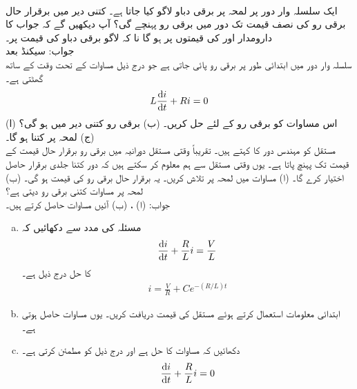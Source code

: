\\
ایک سلسلہ وار  دور پر لمحہ  پر برقی دباو لاگو کیا جاتا ہے۔ کتنی دیر میں برقرار حال برقی رو کی نصف قیمت تک دور میں برقی رو پہنچے گی؟ آپ دیکھیں گے کہ جواب کا دارومدار  اور  کی قیمتوں پر ہو گا نا کہ لاگو برقی دباو کی قیمت پر۔\\
جواب:\quad
{} سیکنڈ بعد
\\
سلسلہ وار  دور میں ابتدائی طور پر  برقی رو پائی جاتی ہے جو درج ذیل مساوات کے تحت وقت کے ساتھ گھٹتی ہے۔
\begin{align*}
L\frac{\dif i}{\dif t}+Ri=0
\end{align*}
(ا) اس مساوات کو برقی رو  کے لئے حل کریں۔ (ب) برقی رو کتنی دیر میں  ہو گی؟ (ج) لمحہ  پر  کتنا ہو گا۔
\\
مستقل  کو مہندس  دور کا  کہتے ہیں۔ تقریباً  وقتی مستقل دورانیہ میں برقی رو برقرار حال قیمت کے  قیمت تک پہنچ پاتا ہے۔ یوں وقتی مستقل سے ہم معلوم کر سکتے ہیں کہ دور کتنا جلدی برقرار حاصل اختیار کرے گا۔ (ا) مساوات  میں لمحہ  پر  تلاش کریں۔ یہ برقرار حال برقی رو کی  قیمت ہو گی۔ (ب) لمحہ  پر  مساوات  کتنی برقی رو دیتی ہے؟\\
جواب:\quad
(ا) ، (ب) 
آئیں مساوات  حاصل کرتے ہیں۔ 
\begin{enumerate}[a.]
\item
مسئلہ  کی مدد سے دکھائیں کہ 
\begin{align*}
\frac{\dif i}{\dif t}+\frac{R}{L}i=\frac{V}{L}
\end{align*}
کا حل درج ذیل ہے۔
\begin{align*}
i=\frac{V}{R}+Ce^{-(R/L)t}
\end{align*}
\item
ابتدائی معلومات  استعمال کرتے ہوئے مستقل  کی قیمت دریافت کریں۔ یوں مساوات  حاصل ہوتی ہے۔
\item
دکھائیں کہ  مساوات  کا حل ہے اور درج ذیل  کو مطمئن کرتی ہے۔
\begin{align*}
\frac{\dif i}{\dif t}+\frac{R}{L}i=0
\end{align*}
\end{enumerate}
